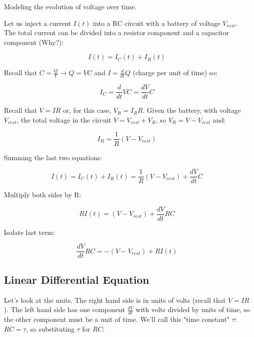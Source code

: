 \documentclass[../doc.tex]{subfiles}
\begin{document}
Modeling the evolution of voltage over time.

Let us inject a current $I(t)$ into a RC circuit with a battery of voltage $V_{rest}$. The total current can be divided into a resistor component and a capacitor component (Why?):

\begin{equation}
I(t) = I_C (t) + I_R (t) 
\end{equation}

Recall that $C = \frac{Q}{V} \rightarrow Q = VC$ and $I = \frac{d}{dt} Q$ (charge per unit of time) so:

\begin{equation}
I_C =  \frac{d}{dt} VC = \frac{dV}{dt} C
\end{equation}

Recall that $V = IR$ or, for this case, $V_R = I_R R$. Given the battery, with voltage $V_{rest}$, the total voltage in the circuit $V = V_{rest} + V_R$, so $V_R = V - V_{rest}$ and:

\begin{equation}
I_R  =  \frac{1}{R} (V - V_{rest})
\end{equation}

Summing the last two equations:

\begin{equation}
I(t) = I_C (t) + I_R (t) = \frac{1}{R} (V - V_{rest}) +  \frac{dV}{dt} C
\end{equation}

Multiply both sides by R:

\begin{equation}
R I(t) =  (V - V_{rest}) + \frac{dV}{dt} RC
\end{equation}

Isolate last term:

\begin{equation}
\frac{dV}{dt} RC =  - (V - V_{rest}) + R I(t)
\end{equation}

\subsection{Linear Differential Equation}

Let's look at the units. The right hand side is in units of volts (recall that $V = IR$). The left hand side has one component $\frac{dV}{dt}$ with volts divided by units of time, so the other component must be a unit of time. We'll call this "time constant" $\tau$: $RC = \tau$, so substituting $\tau$ for $RC$:
\end{document}
